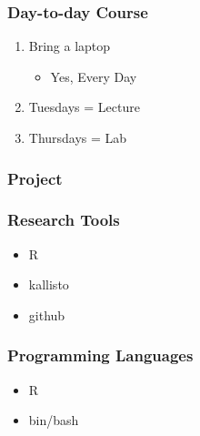 \documentclass{beamer}
\begin{document}
\begin{frame}
\frametitle{Day-to-day Course}
\begin{enumerate}
\item<1-> Bring a laptop
\begin{itemize}
	\item<2-> Yes, Every Day
\end{itemize}
\item<3-> Tuesdays = Lecture
\item<4-> Thursdays = Lab
\end{enumerate}
\end{frame}
\begin{frame}
\frametitle{Project}
\end{frame}
\begin{frame}
\frametitle{Research Tools}
\begin{itemize}
	\item R
	\item kallisto
	\item github
\end{itemize}
\end{frame}
\begin{frame}
\frametitle{Programming Languages}
\begin{itemize}
	\item R
	\item bin/bash
\end{itemize}
\end{frame}
\end{document}

